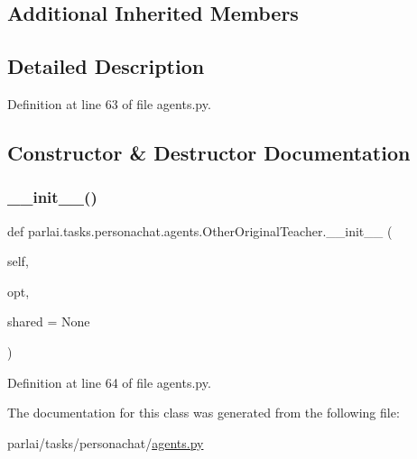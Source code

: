 \subsection*{Additional Inherited Members}


\subsection{Detailed Description}


Definition at line 63 of file agents.\+py.



\subsection{Constructor \& Destructor Documentation}
\mbox{\label{classparlai_1_1tasks_1_1personachat_1_1agents_1_1OtherOriginalTeacher_abd6f89edfdb5f7594fc3e63cc1c940b8}} 
\subsubsection{\texorpdfstring{\+\_\+\+\_\+init\+\_\+\+\_\+()}{\_\_init\_\_()}}
{\footnotesize\ttfamily def parlai.\+tasks.\+personachat.\+agents.\+Other\+Original\+Teacher.\+\_\+\+\_\+init\+\_\+\+\_\+ (\begin{DoxyParamCaption}\item[{}]{self,  }\item[{}]{opt,  }\item[{}]{shared = {\ttfamily None} }\end{DoxyParamCaption})}



Definition at line 64 of file agents.\+py.



The documentation for this class was generated from the following file\+:\begin{DoxyCompactItemize}
\item 
parlai/tasks/personachat/\hyperlink{parlai_2tasks_2personachat_2agents_8py}{agents.\+py}\end{DoxyCompactItemize}
